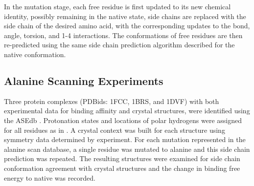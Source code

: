 In the mutation stage, each free residue is first updated to its new chemical identity, possibly remaining in the native state, side chains are replaced with the side chain of the desired amino acid, with the corresponding updates to the bond, angle, torsion, and 1-4 interactions.
The conformations of free residues are then re-predicted using the same side chain prediction algorithm described for the native conformation.

\subsection{Alanine Scanning Experiments}
Three protein complexes (PDBids: 1FCC, 1BRS, and 1DVF) with both experimental data for binding affinity and crystal structures, were identified using the ASEdb \cite{thorn2001asedb,sauer1995crystal,buckle1994protein,braden1996crystal}.
Protonation states and locations of polar hydrogens were assigned for all residues as in \cite{li2007assignment}.
A crystal context was built for each structure using symmetry data determined by experiment.
For each mutation represented in the alanine scan database, a single residue was mutated to alanine and this side chain prediction was repeated.
The resulting structures were examined for side chain conformation agreement with crystal structures and the change in binding free energy to native was recorded. 
